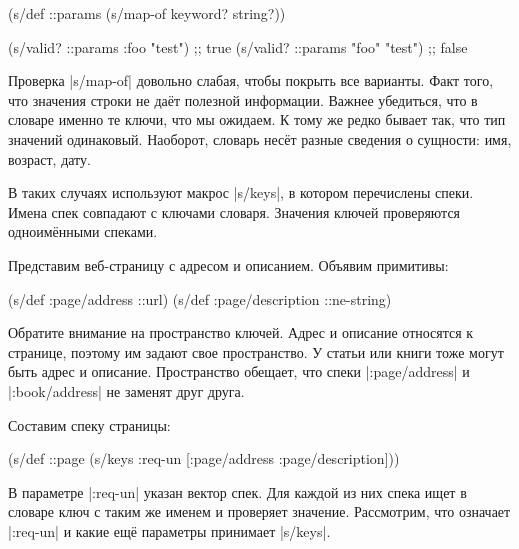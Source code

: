 \begin{english}
  \begin{clojure}
(s/def ::params
  (s/map-of keyword? string?))

(s/valid? ::params {:foo "test"})  ;; true
(s/valid? ::params {"foo" "test"}) ;; false
  \end{clojure}
\end{english}

Проверка \spverb|s/map-of| довольно слабая, чтобы покрыть все варианты. Факт
того, что значения строки не да\"{е}т полезной информации. Важнее убедиться, что
в словаре именно те ключи, что мы ожидаем. К тому же редко бывает так, что тип
значений одинаковый. Наоборот, словарь нес\"{е}т разные сведения о сущности:
имя, возраст, дату.


В таких случаях используют макрос \spverb|s/keys|, в котором перечислены
спеки. Имена спек совпадают с ключами словаря. Значения ключей проверяются
одноим\"{е}нными спеками.

Представим веб-страницу с адресом и описанием. Объявим примитивы:

\begin{english}
  \begin{clojure}
(s/def :page/address ::url)
(s/def :page/description ::ne-string)
  \end{clojure}
\end{english}


Обратите внимание на пространство ключей. Адрес и описание относятся к странице,
поэтому им задают свое пространство. У статьи или книги тоже могут быть адрес и
описание. Пространство обещает, что спеки \spverb|:page/address| и
\spverb|:book/address| не заменят друг друга.

Составим спеку страницы:

\begin{english}
  \begin{clojure}
(s/def ::page
  (s/keys :req-un [:page/address
                   :page/description]))
  \end{clojure}
\end{english}


В параметре \spverb|:req-un| указан вектор спек. Для каждой из них спека ищет в
словаре ключ с таким же именем и проверяет значение. Рассмотрим, что означает
\spverb|:req-un| и какие ещ\"{е} параметры принимает \spverb|s/keys|.

